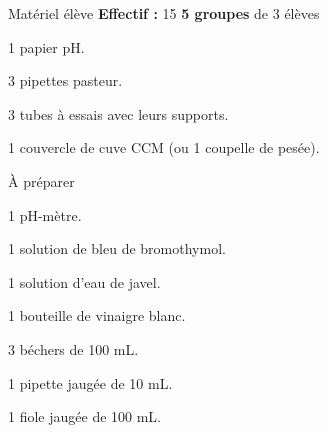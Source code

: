 
\begin{boiteMateriel}{Matériel élève}
  \textbf{Effectif :} 15
  \qq{}\qq{}
  \flecheLongue \textbf{5 groupes} de 3 élèves

  \begin{protocole}[2]
    \item 1 papier pH.
    \item 3 pipettes pasteur.
    \item 3 tubes à essais avec leurs supports.
    \item 1 couvercle de cuve CCM (ou 1 coupelle de pesée).
  \end{protocole}
\end{boiteMateriel}


\begin{boiteMateriel}{À préparer}
    \begin{protocole}
      \item 1 pH-mètre.
      \item 1 solution de bleu de bromothymol.
      \item 1 solution d'eau de javel.
      \item 1 bouteille de vinaigre blanc.
      \item 3 béchers de 100 mL.
      \item 1 pipette jaugée de 10 mL.
      \item 1 fiole jaugée de 100 mL.
    \end{protocole}
\end{boiteMateriel}